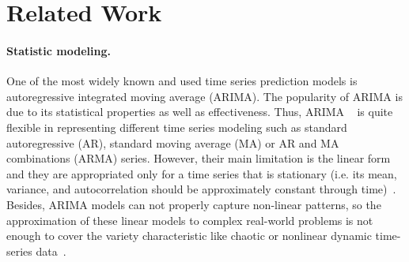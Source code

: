 \documentclass[smallcondensed, natbib]{svjour3}     %
\begin{document}
\section{Related Work}
\label{related_work}

\paragraph{Statistic modeling.} One of the most widely known and used time series prediction models is autoregressive integrated moving average (ARIMA). The popularity of ARIMA is due to its statistical properties as well as effectiveness. Thus, ARIMA ~\citep{ref_mckenzie} is quite flexible in representing different time series modeling such as standard autoregressive (AR), standard moving average (MA) or AR and MA combinations (ARMA) series. However, their main limitation is the linear form and they are appropriated only for a time series that is stationary (i.e. its mean, variance, and autocorrelation should be approximately constant through time)~\citep{petricua2016limitation}. Besides, ARIMA models can not properly capture non-linear patterns, so the approximation of these linear models to complex real-world problems is not enough to cover the variety characteristic like chaotic or nonlinear dynamic time-series data~\citep{kajitani2005forecasting}. 
\end{document}
